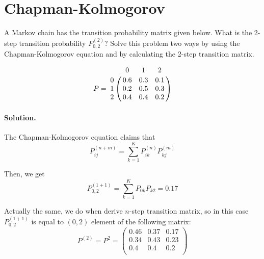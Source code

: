 \documentclass[a4paper, 12pt]{article}
\newcommand{\sol}[1]{\paragraph{Solution.} #1}
\begin{document}
\section{Chapman-Kolmogorov}
A Markov chain has the transition probability matrix given below. What is the 2-step transition probability
$P^{(2)}_{0,2}$? Solve this problem two ways by using the Chapman-Kolmogorov
equation and by calculating the 2-step transition matrix.

\[
    P = \bordermatrix{
        & 0 & 1 & 2 \cr
        0 & 0.6 & 0.3 & 0.1  \cr
        1 & 0.2 & 0.5 & 0.3 \cr
        2 & 0.4 & 0.4 & 0.2
    }
\]

\sol{
    The Chapman-Kolmogorov equation claims that
    \[
        P^{(n+m)}_{ij} =
        \sum\limits_{k=1}^{K} P^{(n)}_{ik} P^{(m)}_{kj}
    \]

    Then, we get
    \[
        P^{(1+1)}_{0,2} =
        \sum\limits_{k=1}^{K} P_{0k} P_{k2} = 0.17
    \]

    Actually the same, we do when derive $n$-step transition matrix, so
    in this case $P^{(1+1)}_{0,2}$ is equal to $(0,2)$ element of the
    following matrix:
    \[
        P^{(2)} = P^2 = \begin{pmatrix}
            0.46 & 0.37 & 0.17 \\
            0.34 & 0.43 & 0.23 \\
            0.4  & 0.4  & 0.2  \\
        \end{pmatrix}
    \]
}
\end{document}
